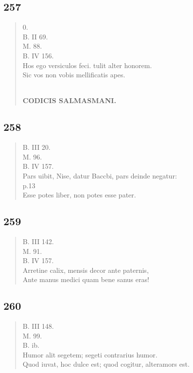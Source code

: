 \documentclass[11pt, a4paper]{report}
\begin{document}
            \subsection*{257}
      \begin{verse}
      0. \\ B. II 69. \\ M. 88. \\ B. IV 156. \\ Hos ego versiculos feci. tulit alter honorem. \\ Sic vos non vobis mellificatis apes. \\ 
        ﻿\pagebreak 
    \begin{center} \textbf{CODICIS SALMASMANI.} \end{center} \marginpar{[01]} 
      \end{verse}
  
            \subsection*{258}
      \begin{verse}
      B. III 20. \\ M. 96. \\ B. IV 157. \\ Pars uibit, Nise, datur Baccbi, pars deinde negatur: \\ p.13 \\ Esse potes liber, non potes esse pater. \\ 
      \end{verse}
  
            \subsection*{259}
      \begin{verse}
      B. III 142. \\ M. 91. \\ B. IV 157. \\ Arretine calix, mensis decor ante paternis, \\ Ante manus medici quam bene sanus eras! \\ 
      \end{verse}
  
            \subsection*{260}
      \begin{verse}
      B. III 148. \\ M. 99. \\ B. ib. \\ Humor alit segetem; segeti contrarius humor. \\ Quod iuvat, \lbrack hoc \rbrack  dulce est; quod cogitur, alteramors est. \\ 
      \end{verse}
  
\end{document}
